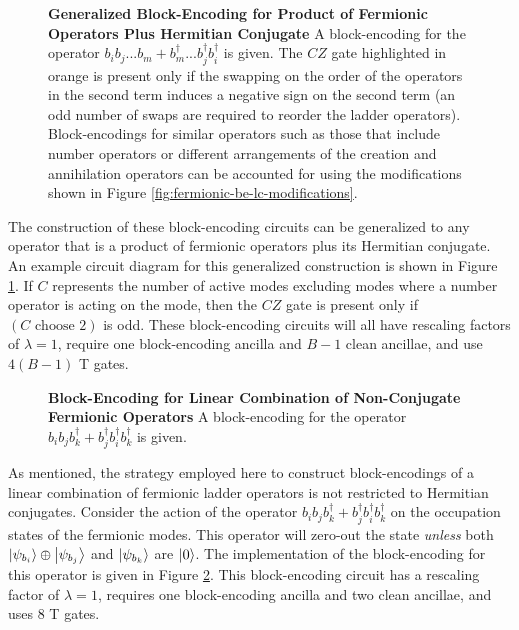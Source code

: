 \begin{figure*}
    
    \caption{
        \textbf{Generalized Block-Encoding for Product of Fermionic Operators Plus Hermitian Conjugate}
        A block-encoding for the operator $b_i b_j ... b_m + b_m^\dagger ... b_j^\dagger b_i^\dagger$ is given.
        The $CZ$ gate highlighted in orange is present only if the swapping on the order of the operators in the second term induces a negative sign on the second term (an odd number of swaps are required to reorder the ladder operators).
        Block-encodings for similar operators such as those that include number operators or different arrangements of the creation and annihilation operators can be accounted for using the modifications shown in Figure \ref{fig:fermionic-be-lc-modifications}.
    }
    \label{fig:fermionic-be-lc}
\end{figure*}

The construction of these block-encoding circuits can be generalized to any operator that is a product of fermionic operators plus its Hermitian conjugate.
An example circuit diagram for this generalized construction is shown in Figure \ref{fig:fermionic-be-lc}.
If $C$ represents the number of active modes excluding modes where a number operator is acting on the mode, then the $CZ$ gate is present only if $(C \text{ choose } 2)$ is odd.
These block-encoding circuits will all have rescaling factors of $\lambda=1$, require one block-encoding ancilla and $B - 1$ clean ancillae, and use $4(B-1)$ T gates.

\begin{figure}
    
    \caption{
        \textbf{Block-Encoding for Linear Combination of Non-Conjugate Fermionic Operators}
        A block-encoding for the operator $b_i b_j b_k^\dagger + b_j^\dagger b_i^\dagger b_k^\dagger$ is given.
    }
    \label{fig:fermionic-be-lc-not-conjugate}
\end{figure}

As mentioned, the strategy employed here to construct block-encodings of a linear combination of fermionic ladder operators is not restricted to Hermitian conjugates.
Consider the action of the operator $b_i b_j b_k^\dagger + b_j^\dagger b_i^\dagger b_k^\dagger$ on the occupation states of the fermionic modes.
This operator will zero-out the state \textit{unless} both $\ket{\psi_{b_i}} \oplus \ket{\psi_{b_j}}$ and $\ket{\psi_{b_k}}$ are $\ket{0}$.
The implementation of the block-encoding for this operator is given in Figure \ref{fig:fermionic-be-lc-not-conjugate}.
This block-encoding circuit has a rescaling factor of $\lambda = 1$, requires one block-encoding ancilla and two clean ancillae, and uses $8$ T gates.

